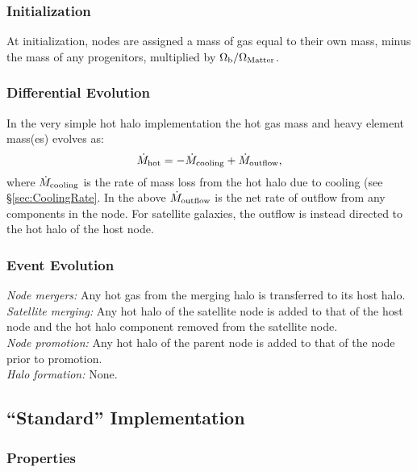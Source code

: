 \subsubsection{Initialization}

At initialization, nodes are assigned a mass of gas equal to their own mass, minus the mass of any progenitors, multiplied by $\Omega_{\rm b}/\Omega_{\rm Matter}$.

\subsubsection{Differential Evolution}

In the very simple hot halo implementation the hot gas mass and heavy element mass(es) evolves as:
\begin{equation}
 \dot{M}_{\rm hot} = - \dot{M}_{\rm cooling} + \dot{M}_{\rm outflow},
\end{equation}
where $\dot{M}_{\rm cooling}$ is the rate of mass loss from the hot halo due to cooling (see \S\ref{sec:CoolingRate}.
In the above $\dot{M}_{\rm outflow}$ is the net rate of outflow from any components in the node. For satellite galaxies, the outflow is instead directed to the hot halo of the host \gls{node}.

\subsubsection{Event Evolution}

\noindent\emph{Node mergers:} Any hot gas from the merging halo is transferred to its host halo.\\

\noindent\emph{Satellite merging:} Any hot halo of the satellite \gls{node} is added to that of the host \gls{node} and the hot halo \gls{component} removed from the satellite node.\\

\noindent\emph{Node promotion:} Any hot halo of the parent \gls{node} is added to that of the \gls{node} prior to promotion.\\

\noindent\emph{Halo formation:} None.\\

\subsection{``Standard'' Implementation}

\subsubsection{Properties}

